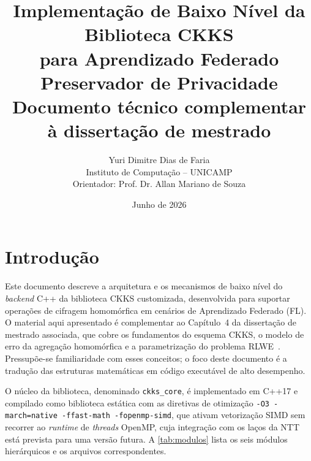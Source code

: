\documentclass[11pt,a4paper]{report}
\begin{document}
\title{\textbf{Implementação de Baixo Nível da Biblioteca CKKS\\
para Aprendizado Federado Preservador de Privacidade}\\[1em]
\large Documento técnico complementar à dissertação de mestrado}
\author{Yuri Dimitre Dias de Faria\\
\small Instituto de Computação -- UNICAMP\\
\small Orientador: Prof. Dr. Allan Mariano de Souza}
\date{Junho de 2026}
\maketitle

\tableofcontents
\listoffigures
\listofalgorithms

\chapter{Introdução}
\label{cap:intro}

Este documento descreve a arquitetura e os mecanismos de baixo nível do \emph{backend}
C++ da biblioteca CKKS customizada, desenvolvida para suportar operações de cifragem
homomórfica em cenários de Aprendizado Federado (FL). O material aqui apresentado
é complementar ao Capítulo~4 da dissertação de mestrado associada, que cobre os fundamentos
do esquema CKKS, o modelo de erro da agregação homomórfica e a parametrização do
problema RLWE~\cite{Cheon2017,sealmanual}. Pressupõe-se familiaridade com esses
conceitos; o foco deste documento é a tradução das estruturas matemáticas em código
executável de alto desempenho.

O núcleo da biblioteca, denominado \texttt{ckks\_core}, é implementado em C++17 e
compilado como biblioteca estática com as diretivas de otimização
\texttt{-O3 -march=native -ffast-math -fopenmp-simd}, que ativam vetorização SIMD
sem recorrer ao \emph{runtime} de \emph{threads} OpenMP, cuja integração com os
laços da NTT está prevista para uma versão futura. A \cref{tab:modulos} lista os
seis módulos hierárquicos e os arquivos correspondentes.
\end{document}
